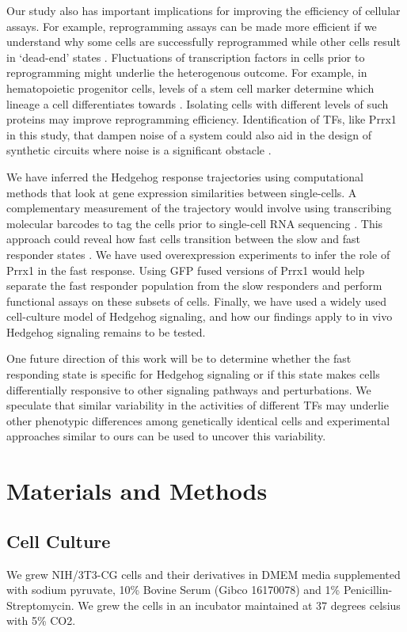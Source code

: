 Our study also has important implications for improving the efficiency of cellular assays. For example, reprogramming assays can be made more efficient if we understand why some cells are successfully reprogrammed while other cells result in ‘dead-end’ states \cite{Biddy2018-ct,Graf2009-qr,Francesconi2019-ol}. Fluctuations of transcription factors in cells prior to reprogramming might underlie the heterogenous outcome. For example, in hematopoietic progenitor cells, levels of a stem cell marker determine  which lineage a cell differentiates towards \cite{Chang2008-kv}. Isolating cells with different levels of such proteins may improve reprogramming efficiency. Identification of TFs, like Prrx1 in this study, that dampen noise of a system could also aid in the design of synthetic circuits where noise is a significant obstacle \cite{Murphy2010-zb}.

We have inferred the Hedgehog response trajectories using computational methods that look at gene expression similarities between single-cells. A complementary measurement of the trajectory would involve using transcribing molecular barcodes to tag the cells prior to single-cell RNA sequencing \cite{Kong2020-ox}. This approach could reveal how fast cells transition between the slow and fast responder states \cite{Hormoz2016-wo,Stumpf2017-ne,Larsson2021-ub}. We have used overexpression experiments to infer the role of Prrx1 in the fast response. Using GFP fused versions of Prrx1 would help separate the fast responder population from the slow responders and perform functional assays on these subsets of cells. Finally, we have used a widely used cell-culture model of Hedgehog signaling, and how our findings apply to in vivo Hedgehog signaling remains to be tested. 

One future direction of this work will be to determine whether the fast responding state is specific for Hedgehog signaling or if this state makes cells differentially responsive to other signaling pathways and perturbations. We speculate that similar variability in the activities of different TFs may underlie other phenotypic differences among genetically identical cells and experimental approaches similar to ours can be used to uncover this variability.

\section{Materials and Methods}

\subsection{Cell Culture}
We grew NIH/3T3-CG cells and their derivatives in DMEM media supplemented with sodium pyruvate, 10\% Bovine Serum (Gibco 16170078) and 1\% Penicillin-Streptomycin. We grew the cells in an incubator maintained at 37 degrees celsius with 5\% CO2.

